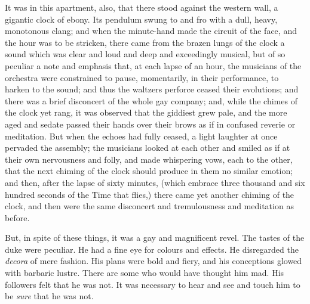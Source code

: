 \documentclass[smalldemyvopaper,14pt,twoside,onecolumn,openright,extrafontsizes,showtrims]{memoir}
\begin{document}
It was in this apartment, also, that there stood against the western wall, a gigantic clock of ebony. Its pendulum swung to and fro with a dull, heavy, monotonous clang; and when the minute-hand made the circuit of the face, and the hour was to be stricken, there came from the brazen lungs of the clock a sound which was clear and loud and deep and exceedingly musical, but of so peculiar a note and emphasis that, at each lapse of an hour, the musicians of the orchestra were constrained to pause, momentarily, in their performance, to harken to the sound; and thus the waltzers perforce ceased their evolutions; and there was a brief disconcert of the whole gay company; and, while the chimes of the clock yet rang, it was observed that the giddiest grew pale, and the more aged and sedate passed their hands over their brows as if in confused reverie or meditation. But when the echoes had fully ceased, a light laughter at once pervaded the assembly; the musicians looked at each other and smiled as if at their own nervousness and folly, and made whispering vows, each to the other, that the next chiming of the clock should produce in them no similar emotion; and then, after the lapse of sixty minutes, (which embrace three thousand and six hundred seconds of the Time that flies,) there came yet another chiming of the clock, and then were the same disconcert and tremulousness and meditation as before.

But, in spite of these things, it was a gay and magnificent revel. The tastes of the duke were peculiar. He had a fine eye for colours and effects. He disregarded the \textit{decora} of mere fashion. His plans were bold and fiery, and his conceptions glowed with barbaric lustre. There are some who would have thought him mad. His followers felt that he was not. It was necessary to hear and see and touch him to be \textit{sure} that he was not.
\end{document}
